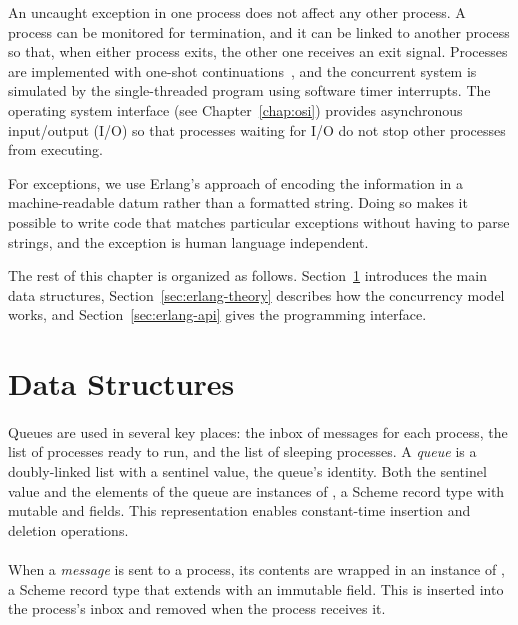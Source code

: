 An uncaught exception in one process does not affect any other
process. A process can be monitored for termination, and it can be
linked to another process so that, when either process exits, the
other one receives an exit signal.  Processes are implemented with
one-shot continuations~\cite{one-shot}, and the concurrent system is
simulated by the single-threaded program using software
timer interrupts.  The operating system interface (see
Chapter~\ref{chap:osi}) provides asynchronous input/output (I/O) so
that processes waiting for I/O do not stop other processes from
executing.

For exceptions, we use Erlang's approach of encoding the information
in a machine-readable datum rather than a formatted string. Doing so
makes it possible to write code that matches particular exceptions
without having to parse strings, and the exception is human language
independent.

The rest of this chapter is organized as follows.
Section~\ref{sec:erlang-data-structures} introduces the main data structures,
Section~\ref{sec:erlang-theory} describes how the concurrency
model works, and Section~\ref{sec:erlang-api} gives the
programming interface.

\section {Data Structures}\label{sec:erlang-data-structures}

\paragraph {}
Queues are used in several key places: the inbox of messages for each
process, the list of processes ready to run, and the list of sleeping
processes. A \emph{queue} is a doubly-linked list with a sentinel
value, the queue's identity. Both the sentinel value and the elements
of the queue are instances of , a Scheme record type with
mutable  and  fields.  This representation
enables constant-time insertion and deletion operations.

\paragraph {}
When a \emph{message} is sent to a process, its contents are wrapped
in an instance of , a Scheme record type that extends
 with an immutable  field. This
 is inserted into the process's inbox and removed when the
process receives it.

